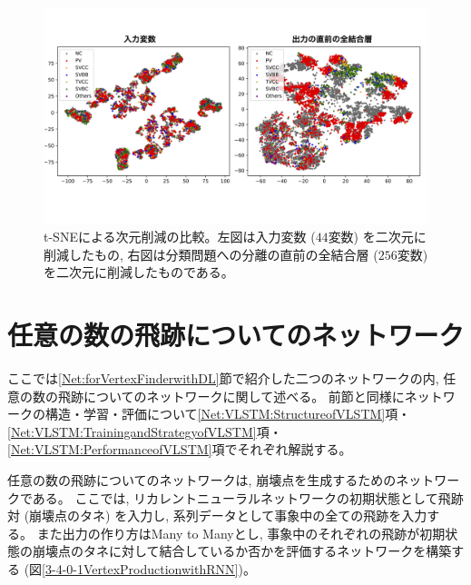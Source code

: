 \begin{figure}[htbp]
 \centering
 \includegraphics[width=1.0\textwidth]{Figure/3Networks/3-3-3-3tSNE.png}
 \caption[t-SNEによる次元削減の比較]{t-SNEによる次元削減の比較。左図は入力変数 ($44$変数) を二次元に削減したもの, 右図は分類問題への分離の直前の全結合層 ($256$変数) を二次元に削減したものである。}
 \label{3-3-3-3tSNE}
\end{figure}


\section{任意の数の飛跡についてのネットワーク} \label{Net:VertexLSTM}

ここでは\ref{Net:forVertexFinderwithDL}節で紹介した二つのネットワークの内, 任意の数の飛跡についてのネットワークに関して述べる。
前節と同様にネットワークの構造・学習・評価について\ref{Net:VLSTM:StructureofVLSTM}項・\ref{Net:VLSTM:TrainingandStrategyofVLSTM}項・\ref{Net:VLSTM:PerformanceofVLSTM}項でそれぞれ解説する。

任意の数の飛跡についてのネットワークは, 崩壊点を生成するためのネットワークである。
ここでは, リカレントニューラルネットワークの初期状態として飛跡対 (崩壊点のタネ) を入力し, 系列データとして事象中の全ての飛跡を入力する。
また出力の作り方はMany to Manyとし, 事象中のそれぞれの飛跡が初期状態の崩壊点のタネに対して結合しているか否かを評価するネットワークを構築する (図\ref{3-4-0-1VertexProductionwithRNN})。

